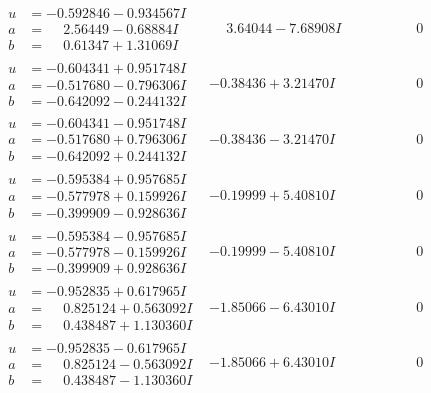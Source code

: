 \documentclass[1p]{elsarticle_modified}
\theoremstyle{definition}
\begin{document}
$$\begin{array}{c|c|c}
\begin{aligned}
u &= -0.592846 - 0.934567 I \\
a &= \phantom{-}2.56449 - 0.68884 I \\
b &= \phantom{-}0.61347 + 1.31069 I\end{aligned}
 & \phantom{-}3.64044 - 7.68908 I & \phantom{-0.000000 } 0 \\ \hline\begin{aligned}
u &= -0.604341 + 0.951748 I \\
a &= -0.517680 - 0.796306 I \\
b &= -0.642092 - 0.244132 I\end{aligned}
 & -0.38436 + 3.21470 I & \phantom{-0.000000 } 0 \\ \hline\begin{aligned}
u &= -0.604341 - 0.951748 I \\
a &= -0.517680 + 0.796306 I \\
b &= -0.642092 + 0.244132 I\end{aligned}
 & -0.38436 - 3.21470 I & \phantom{-0.000000 } 0 \\ \hline\begin{aligned}
u &= -0.595384 + 0.957685 I \\
a &= -0.577978 + 0.159926 I \\
b &= -0.399909 - 0.928636 I\end{aligned}
 & -0.19999 + 5.40810 I & \phantom{-0.000000 } 0 \\ \hline\begin{aligned}
u &= -0.595384 - 0.957685 I \\
a &= -0.577978 - 0.159926 I \\
b &= -0.399909 + 0.928636 I\end{aligned}
 & -0.19999 - 5.40810 I & \phantom{-0.000000 } 0 \\ \hline\begin{aligned}
u &= -0.952835 + 0.617965 I \\
a &= \phantom{-}0.825124 + 0.563092 I \\
b &= \phantom{-}0.438487 + 1.130360 I\end{aligned}
 & -1.85066 - 6.43010 I & \phantom{-0.000000 } 0 \\ \hline\begin{aligned}
u &= -0.952835 - 0.617965 I \\
a &= \phantom{-}0.825124 - 0.563092 I \\
b &= \phantom{-}0.438487 - 1.130360 I\end{aligned}
 & -1.85066 + 6.43010 I & \phantom{-0.000000 } 0 \\ \hline\begin{aligned}

\end{aligned}
\end{array}$$
\end{document}
